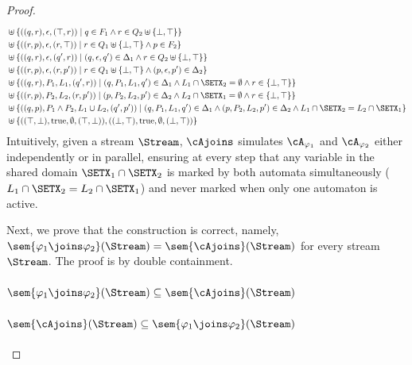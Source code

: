 \begin{proof}
\[\begin{aligned}[t]
		& \uplus \{((q, r), \epsilon, (\top, r)) \mid q \in F_1 \land r \in Q_2 \uplus \{\bot, \top\}\} \\
		& \uplus \{((r, p), \epsilon, (r, \top)) \mid r \in Q_1 \uplus \{\bot, \top\} \land p \in F_2\} \\
		& \uplus \{((q, r), \epsilon, (q', r)) \mid (q, \epsilon, q') \in \Delta_1 \land r \in Q_2 \uplus \{\bot, \top\}\} \\
		& \uplus \{((r, p), \epsilon, (r, p')) \mid r \in Q_1 \uplus \{\bot, \top\} \land (p, \epsilon, p') \in \Delta_2\} \\
		& \uplus \{((q, r), P_1, L_1, (q', r)) \mid (q, P_1, L_1, q') \in \Delta_1 \land L_1 \cap \SETX_2 = \emptyset \land r \in \{\bot, \top\}\} \\
		& \uplus \{((r, p), P_2, L_2, (r, p')) \mid (p, P_2, L_2, p') \in \Delta_2 \land L_2 \cap \SETX_1 = \emptyset \land r \in \{\bot, \top\}\} \\
		& \uplus \{((q, p), P_1 \land P_2, L_1 \cup L_2, (q', p')) \mid (q, P_1, L_1, q') \in \Delta_1 \land (p, P_2, L_2, p') \in \Delta_2 \land L_1 \cap \SETX_2 = L_2 \cap \SETX_1\} \\
		& \uplus \{((\top, \bot), \text{true}, \emptyset, (\top, \bot)), ((\bot, \top), \text{true}, \emptyset, (\bot, \top))\}
	\end{aligned}
	\]
	Intuitively, given a stream $\Stream$, $\cAjoins$ simulates $\cA_{\varphi_1}$ and $\cA_{\varphi_2}$ either independently or in parallel, ensuring at every step that any variable in the shared domain $\SETX_1 \cap \SETX_2$ is marked by both automata simultaneously ($L_1 \cap \SETX_2 = L_2 \cap \SETX_1$) and never marked when only one automaton is active.
	
	Next, we prove that the construction is correct, namely, $\sem{\varphi_1 \joins \varphi_2}(\Stream) = \sem{\cAjoins}(\Stream)$ for every stream $\Stream$. The proof is by double containment. 
	
	\paragraph{$\sem{\varphi_1 \joins \varphi_2}(\Stream) \subseteq \sem{\cAjoins}(\Stream)$}
	\vspace{4cm}
	
	\paragraph{$\sem{\cAjoins}(\Stream) \subseteq \sem{\varphi_1 \joins \varphi_2}(\Stream)$}
	\vspace{4cm}
	
\end{proof}